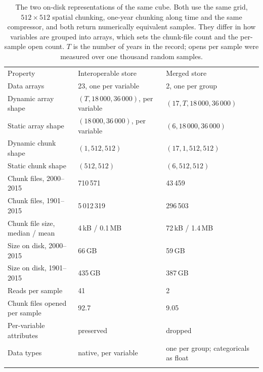 \documentclass[gmd, manuscript]{copernicus}
\begin{document}
\begin{table}[t]
\caption{The two on-disk representations of the same cube. Both use the same grid,
$512\times512$ spatial chunking, one-year chunking along time and the same compressor, and both
return numerically equivalent samples. They differ in how variables are grouped into arrays,
which sets the chunk-file count and the per-sample open count. $T$ is the number of years in
the record; opens per sample were measured over one thousand random samples.}
\label{tab:layouts}
\begin{tabular}{lll}
\tophline
Property & Interoperable store & Merged store \\
\middlehline
Data arrays                    & 23, one per variable                  & 2, one per group \\
Dynamic array shape            & $(T, 18\,000, 36\,000)$, per variable & $(17, T, 18\,000, 36\,000)$ \\
Static array shape             & $(18\,000, 36\,000)$, per variable    & $(6, 18\,000, 36\,000)$ \\
Dynamic chunk shape            & $(1, 512, 512)$                       & $(17, 1, 512, 512)$ \\
Static chunk shape             & $(512, 512)$                          & $(6, 512, 512)$ \\
Chunk files, 2000--2015        & 710\,571                              & 43\,459 \\
Chunk files, 1901--2015        & 5\,012\,319                           & 296\,503 \\
Chunk file size, median / mean & 4\,kB / 0.1\,MB                       & 72\,kB / 1.4\,MB \\
Size on disk, 2000--2015       & 66\,GB                                & 59\,GB \\
Size on disk, 1901--2015       & 435\,GB                               & 387\,GB \\
Reads per sample               & 41                                    & 2 \\
Chunk files opened per sample  & 92.7                                  & 9.05 \\
Per-variable attributes        & preserved                             & dropped \\
Data types                     & native, per variable                  & one per group; categoricals as float \\
\bottomhline
\end{tabular}
\end{table}
\end{document}
